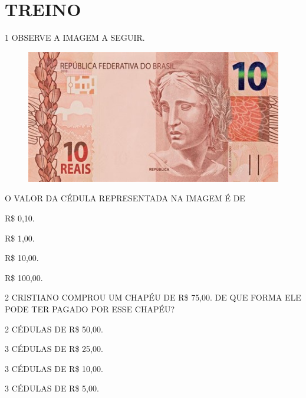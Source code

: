 \begin{mdframed}[linewidth=2pt,linecolor=salmao,roundcorner=10pt]
\vspace{18.5cm}
\end{mdframed}

\pagebreak
\section*{TREINO}

\num{1} OBSERVE A IMAGEM A SEGUIR.


\begin{figure}[htpb!]
\centering
\includegraphics[width=.5\textwidth]{./media/SAEB_1ANO_MAT_FIGURA82.jpg}
\end{figure}

O VALOR DA CÉDULA REPRESENTADA NA IMAGEM É DE

\begin{multicols}{2}
\begin{escolha}
\item R\$ 0,10.

\item R\$ 1,00.

\item R\$ 10,00.

\item R\$ 100,00.
\end{escolha}
\end{multicols}

\num{2} CRISTIANO COMPROU UM CHAPÉU DE R\$ 75,00. DE QUE FORMA ELE PODE TER PAGADO POR ESSE CHAPÉU?

\begin{multicols}{2}
\begin{escolha}
\item 2 CÉDULAS DE R\$ 50,00.

\item 3 CÉDULAS DE R\$ 25,00.

\item 3 CÉDULAS DE R\$ 10,00.

\item 3 CÉDULAS DE R\$ 5,00.
\end{escolha}
\end{multicols}


